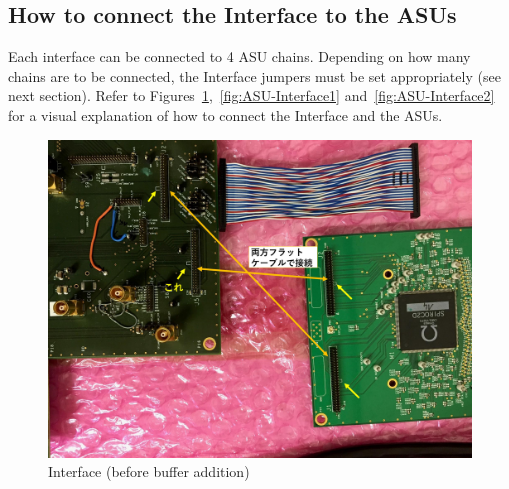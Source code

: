 \subsection{How to connect the Interface to the
  ASUs}\label{sec:interface-ASU-connection}
Each interface can be connected to 4 ASU chains. Depending on how many chains
are to be connected, the Interface jumpers must be set appropriately (see next
section).  Refer to
Figures~\ref{fig:Interface_ASU_connection},~\ref{fig:ASU-Interface1}
and~\ref{fig:ASU-Interface2} for a visual explanation of how to connect the
Interface and the ASUs.
\begin{figure}[H]
  \centering \includegraphics[width=0.6\linewidth,
  frame]{Interface_ASU_connection}
  \caption{Interface (before buffer
    addition)}\label{fig:Interface_ASU_connection}
\end{figure}

